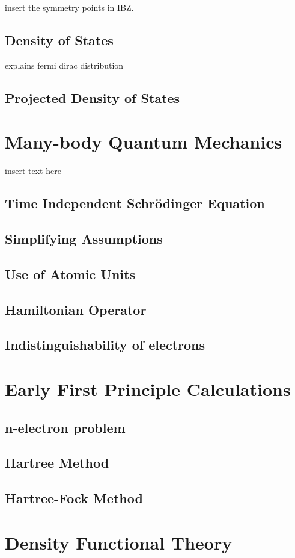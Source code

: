        insert the symmetry points in IBZ.
    \subsection{Density of States}
    explains fermi dirac distribution
    \subsection{Projected Density of States}
\section{Many-body Quantum Mechanics}
insert text here
    \subsection{Time Independent Schr{\"o}dinger Equation}
    \subsection{Simplifying Assumptions}
    \subsection{Use of Atomic Units}
    \subsection{Hamiltonian Operator}
\subsection{Indistinguishability of electrons}
\section{Early First Principle Calculations}
    \subsection{n-electron problem}
    \subsection{Hartree Method}
    \subsection{Hartree-Fock Method}
\section{Density Functional Theory}
